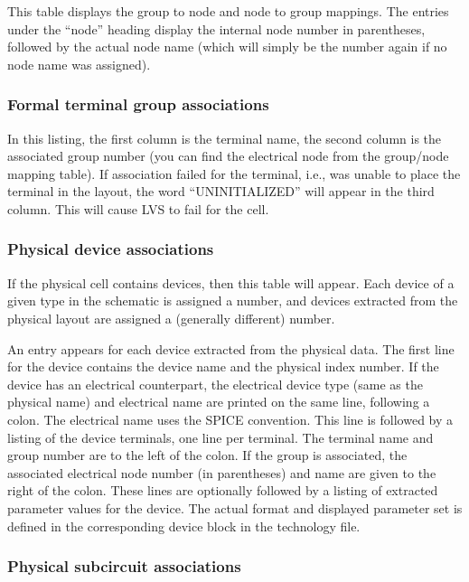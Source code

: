 This table displays the group to node and node to group mappings.
The entries under the ``node'' heading display the internal node
number in parentheses, followed by the actual node name (which
will simply be the number again if no node name was assigned).

\subsubsection{Formal terminal group associations}

In this listing, the first column is the terminal name, the second
column is the associated group number (you can find the electrical
node from the group/node mapping table).  If association failed for
the terminal, i.e., {\Xic} was unable to place the terminal in the
layout, the word ``UNINITIALIZED'' will appear in the third column. 
This will cause LVS to fail for the cell.

\subsubsection{Physical device associations}

If the physical cell contains devices, then this table will
appear.  Each device of a given type in the schematic is
assigned a number, and devices extracted from the physical layout
are assigned a (generally different) number.

An entry appears for each device extracted from the physical data. 
The first line for the device contains the device name and the
physical index number.  If the device has an electrical counterpart,
the electrical device type (same as the physical name) and electrical
name are printed on the same line, following a colon.  The electrical
name uses the SPICE convention.  This line is followed by a listing of
the device terminals, one line per terminal.  The terminal name and
group number are to the left of the colon.  If the group is
associated, the associated electrical node number (in parentheses) and
name are given to the right of the colon.  These lines are optionally
followed by a listing of extracted parameter values for the device. 
The actual format and displayed parameter set is defined in the
corresponding device block in the technology file.

\subsubsection{Physical subcircuit associations}

